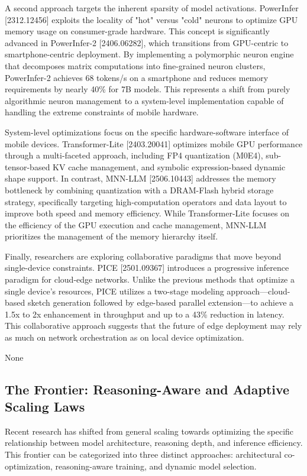 \documentclass[11pt]{article}
\begin{document}
A second approach targets the inherent sparsity of model activations. PowerInfer [2312.12456] exploits the locality of "hot" versus "cold" neurons to optimize GPU memory usage on consumer-grade hardware. This concept is significantly advanced in PowerInfer-2 [2406.06282], which transitions from GPU-centric to smartphone-centric deployment. By implementing a polymorphic neuron engine that decomposes matrix computations into fine-grained neuron clusters, PowerInfer-2 achieves 68 tokens/s on a smartphone and reduces memory requirements by nearly 40\% for 7B models. This represents a shift from purely algorithmic neuron management to a system-level implementation capable of handling the extreme constraints of mobile hardware.

System-level optimizations focus on the specific hardware-software interface of mobile devices. Transformer-Lite [2403.20041] optimizes mobile GPU performance through a multi-faceted approach, including FP4 quantization (M0E4), sub-tensor-based KV cache management, and symbolic expression-based dynamic shape support. In contrast, MNN-LLM [2506.10443] addresses the memory bottleneck by combining quantization with a DRAM-Flash hybrid storage strategy, specifically targeting high-computation operators and data layout to improve both speed and memory efficiency. While Transformer-Lite focuses on the efficiency of the GPU execution and cache management, MNN-LLM prioritizes the management of the memory hierarchy itself.

Finally, researchers are exploring collaborative paradigms that move beyond single-device constraints. PICE [2501.09367] introduces a progressive inference paradigm for cloud-edge networks. Unlike the previous methods that optimize a single device's resources, PICE utilizes a two-stage modeling approach—cloud-based sketch generation followed by edge-based parallel extension—to achieve a 1.5x to 2x enhancement in throughput and up to a 43\% reduction in latency. This collaborative approach suggests that the future of edge deployment may rely as much on network orchestration as on local device optimization.

None
\subsection{The Frontier: Reasoning-Aware and Adaptive Scaling Laws}

Recent research has shifted from general scaling towards optimizing the specific relationship between model architecture, reasoning depth, and inference efficiency. This frontier can be categorized into three distinct approaches: architectural co-optimization, reasoning-aware training, and dynamic model selection.
\end{document}

